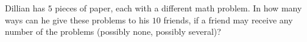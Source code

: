 Dillian has $5$ pieces of paper, each with a different math problem. In how many ways can he give these problems to his $10$ friends, if a friend may receive any number of the problems (possibly none, possibly several)?
